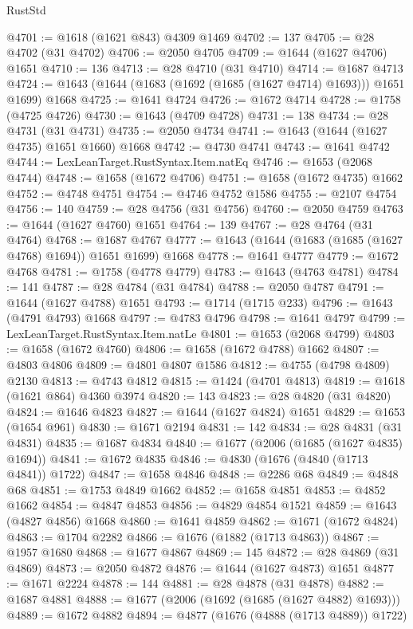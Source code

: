 \begin{lexlean}{RustStd}
\begin{coremodule}
@4701 := @1618 (@1621 @843) @4309 @1469
@4702 := 137
@4705 := @28 @4702 (@31 @4702)
@4706 := @2050 @4705
@4709 := @1644 (@1627 @4706) @1651
@4710 := 136
@4713 := @28 @4710 (@31 @4710)
@4714 := @1687 @4713
@4724 := @1643 (@1644 (@1683 (@1692 (@1685 (@1627 @4714) @1693))) @1651 @1699) @1668
@4725 := @1641 @4724
@4726 := @1672 @4714
@4728 := @1758 (@4725 @4726)
@4730 := @1643 (@4709 @4728)
@4731 := 138
@4734 := @28 @4731 (@31 @4731)
@4735 := @2050 @4734
@4741 := @1643 (@1644 (@1627 @4735) @1651 @1660) @1668
@4742 := @4730 @4741
@4743 := @1641 @4742
@4744 := LexLeanTarget.RustSyntax.Item.natEq
@4746 := @1653 (@2068 @4744)
@4748 := @1658 (@1672 @4706)
@4751 := @1658 (@1672 @4735) @1662
@4752 := @4748 @4751
@4754 := @4746 @4752 @1586
@4755 := @2107 @4754
@4756 := 140
@4759 := @28 @4756 (@31 @4756)
@4760 := @2050 @4759
@4763 := @1644 (@1627 @4760) @1651
@4764 := 139
@4767 := @28 @4764 (@31 @4764)
@4768 := @1687 @4767
@4777 := @1643 (@1644 (@1683 (@1685 (@1627 @4768) @1694)) @1651 @1699) @1668
@4778 := @1641 @4777
@4779 := @1672 @4768
@4781 := @1758 (@4778 @4779)
@4783 := @1643 (@4763 @4781)
@4784 := 141
@4787 := @28 @4784 (@31 @4784)
@4788 := @2050 @4787
@4791 := @1644 (@1627 @4788) @1651
@4793 := @1714 (@1715 @233)
@4796 := @1643 (@4791 @4793) @1668
@4797 := @4783 @4796
@4798 := @1641 @4797
@4799 := LexLeanTarget.RustSyntax.Item.natLe
@4801 := @1653 (@2068 @4799)
@4803 := @1658 (@1672 @4760)
@4806 := @1658 (@1672 @4788) @1662
@4807 := @4803 @4806
@4809 := @4801 @4807 @1586
@4812 := @4755 (@4798 @4809) @2130
@4813 := @4743 @4812
@4815 := @1424 (@4701 @4813)
@4819 := @1618 (@1621 @864) @4360 @3974
@4820 := 143
@4823 := @28 @4820 (@31 @4820)
@4824 := @1646 @4823
@4827 := @1644 (@1627 @4824) @1651
@4829 := @1653 (@1654 @961)
@4830 := @1671 @2194
@4831 := 142
@4834 := @28 @4831 (@31 @4831)
@4835 := @1687 @4834
@4840 := @1677 (@2006 (@1685 (@1627 @4835) @1694))
@4841 := @1672 @4835
@4846 := @4830 (@1676 (@4840 (@1713 @4841)) @1722)
@4847 := @1658 @4846
@4848 := @2286 @68
@4849 := @4848 @68
@4851 := @1753 @4849 @1662
@4852 := @1658 @4851
@4853 := @4852 @1662
@4854 := @4847 @4853
@4856 := @4829 @4854 @1521
@4859 := @1643 (@4827 @4856) @1668
@4860 := @1641 @4859
@4862 := @1671 (@1672 @4824)
@4863 := @1704 @2282
@4866 := @1676 (@1882 (@1713 @4863))
@4867 := @1957 @1680
@4868 := @1677 @4867
@4869 := 145
@4872 := @28 @4869 (@31 @4869)
@4873 := @2050 @4872
@4876 := @1644 (@1627 @4873) @1651
@4877 := @1671 @2224
@4878 := 144
@4881 := @28 @4878 (@31 @4878)
@4882 := @1687 @4881
@4888 := @1677 (@2006 (@1692 (@1685 (@1627 @4882) @1693)))
@4889 := @1672 @4882
@4894 := @4877 (@1676 (@4888 (@1713 @4889)) @1722)

\end{coremodule}
\end{lexlean}
